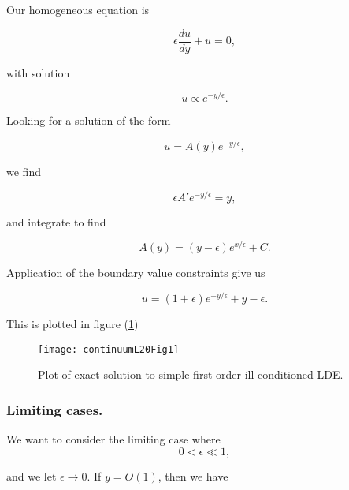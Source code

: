 Our homogeneous equation is 

\begin{equation}\label{eqn:continuumL20:n}
\epsilon \frac{du}{dy} + u = 0,
\end{equation}

with solution

\begin{equation}\label{eqn:continuumL20:n}
u \propto e^{-y/\epsilon}.
\end{equation}

Looking for a solution of the form

\begin{equation}\label{eqn:continuumL20:n}
u = A(y) e^{-y/\epsilon},
\end{equation}

we find

\begin{equation}\label{eqn:continuumL20:n}
\epsilon A' e^{-y/\epsilon} = y,
\end{equation}

and integrate to find

\begin{equation}\label{eqn:continuumL20:n}
A(y) = (y - \epsilon) e^{x/\epsilon} + C.
\end{equation}

Application of the boundary value constraints give us

\begin{equation}\label{eqn:continuumL20:50}
u = ( 1 + \epsilon ) e^{-y/\epsilon} + y - \epsilon.
\end{equation}

This is plotted in figure (\ref{fig:continuumL20:continuumL20Fig1})
\begin{figure}[htp]
   \centering
   \texttt{[image: continuumL20Fig1]}
   \caption{Plot of exact solution to simple first order ill conditioned LDE.}\label{fig:continuumL20:continuumL20Fig1}
\end{figure}

\subsubsection{Limiting cases.}

We want to consider the limiting case where 
\begin{equation}\label{eqn:continuumL20:70}
0 < \epsilon \ll 1,
\end{equation}

and we let $\epsilon \rightarrow 0$.  If $y = O(1)$, then we have


